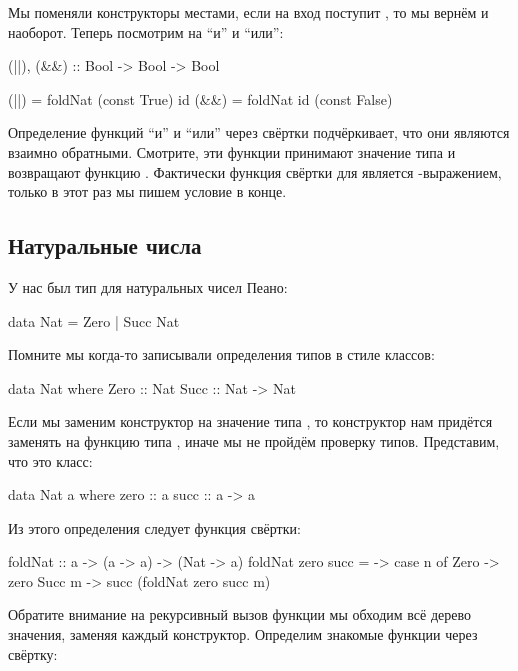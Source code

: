 Мы поменяли конструкторы местами, если на вход поступит , то мы
вернём  и наоборот. Теперь посмотрим на ``и'' и ``или'':


\begin{code}
(||), (&&) :: Bool -> Bool -> Bool

(||) = foldNat  (const True)  id
(&&) = foldNat  id            (const False)
\end{code}

Определение функций ``и'' и ``или'' через свёртки подчёркивает, что они
являются взаимно обратными. Смотрите, эти функции принимают значение
типа  и возвращают функцию . Фактически
функция свёртки для  является -выражением, только в этот
раз мы пишем условие в конце.

\subsection{Натуральные числа}

У нас был тип для натуральных чисел Пеано:


\begin{code}
data Nat = Zero | Succ Nat
\end{code}

Помните мы когда-то записывали определения типов в стиле классов:


\begin{code}
data Nat where
    Zero :: Nat
    Succ :: Nat -> Nat
\end{code}

Если мы заменим конструктор  на значение типа , то
конструктор  нам придётся заменять на функцию типа ,
иначе мы не пройдём проверку типов. Представим, что  это класс:


\begin{code}
data Nat a where
    zero :: a
    succ :: a -> a
\end{code}

Из этого определения следует функция свёртки:


\begin{code}
foldNat :: a -> (a -> a) -> (Nat -> a)
foldNat zero succ = \n -> case n of
    Zero    -> zero
    Succ m  -> succ (foldNat zero succ m)
\end{code}

Обратите внимание на рекурсивный вызов функции  мы обходим
всё дерево значения, заменяя каждый конструктор. Определим знакомые
функции через свёртку:


